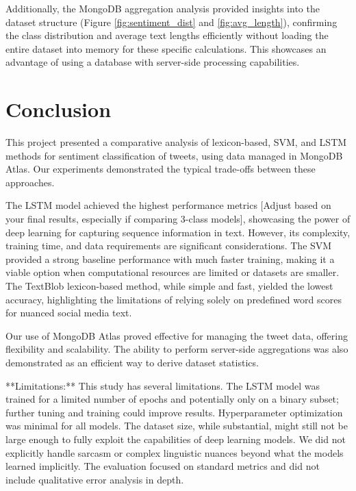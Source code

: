 \documentclass[10pt,twocolumn]{article}
\begin{document}
Additionally, the MongoDB aggregation analysis provided insights into the dataset structure (Figure \ref{fig:sentiment_dist} and \ref{fig:avg_length}), confirming the class distribution and average text lengths efficiently without loading the entire dataset into memory for these specific calculations. This showcases an advantage of using a database with server-side processing capabilities.

\section{Conclusion}
\label{sec:conclusion}

This project presented a comparative analysis of lexicon-based, SVM, and LSTM methods for sentiment classification of tweets, using data managed in MongoDB Atlas. Our experiments demonstrated the typical trade-offs between these approaches.

The LSTM model achieved the highest performance metrics [Adjust based on your final results, especially if comparing 3-class models], showcasing the power of deep learning for capturing sequence information in text. However, its complexity, training time, and data requirements are significant considerations. The SVM provided a strong baseline performance with much faster training, making it a viable option when computational resources are limited or datasets are smaller. The TextBlob lexicon-based method, while simple and fast, yielded the lowest accuracy, highlighting the limitations of relying solely on predefined word scores for nuanced social media text.

Our use of MongoDB Atlas proved effective for managing the tweet data, offering flexibility and scalability. The ability to perform server-side aggregations was also demonstrated as an efficient way to derive dataset statistics.

**Limitations:** This study has several limitations. The LSTM model was trained for a limited number of epochs and potentially only on a binary subset; further tuning and training could improve results. Hyperparameter optimization was minimal for all models. The dataset size, while substantial, might still not be large enough to fully exploit the capabilities of deep learning models. We did not explicitly handle sarcasm or complex linguistic nuances beyond what the models learned implicitly. The evaluation focused on standard metrics and did not include qualitative error analysis in depth.
\end{document}
